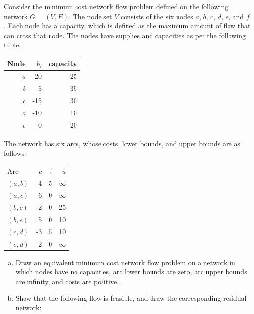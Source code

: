 \documentclass[fleqn]{homework}
\begin{document}
  \maketitle

  \begin{problem}{1}
    \begin{question}
      Consider the minimum cost network flow problem defined on the following
      network $G=(V, E)$. The node set $V$ consists of the six nodes $a$, $b$,
      $c$, $d$, $e$, and $f$. Each node has a capacity, which is defined as the
      maximum amount of flow that can cross that node. The nodes have supplies
      and capacities as per the following table:

      \begin{tabular}{|r|r|r|}
        \hline
        Node & $b_i$ & capacity \\
        \hline
        $a$ & 20 & 25 \\
        $b$ & 5 & 35 \\
        $c$ & -15 & 30 \\
        $d$ & -10 & 10 \\
        $e$ & 0 & 20 \\
        \hline
      \end{tabular}

      The network has six arcs, whose costs, lower bounds, and upper bounds are
      as follows:

      \begin{tabular}{|l|r|r|r|}
        \hline
        Arc & $c$ & $l$ & $u$ \\
        $(a,b)$ & 4 & 5 & $\infty$ \\
        $(a,c)$ & 6 & 0 & $\infty$ \\
        $(b,c)$ & -2 & 0 & 25 \\
        $(b,e)$ & 5 & 0 & 10 \\
        $(c,d)$ & -3 & 5 & 10 \\
        $(e,d)$ & 2 & 0 & $\infty$ \\
        \hline
      \end{tabular}

      \begin{enumerate}[a.]
      \item Draw an equivalent minimum cost network flow problem on a network in
        which nodes have no capacities, arc lower bounds are zero, arc upper
        bounds are infinity, and costs are positive.

      \item Show that the following flow is feasible, and draw the corresponding
        residual network:
      \end{enumerate}


\end{question}
\end{problem}
\end{document}
